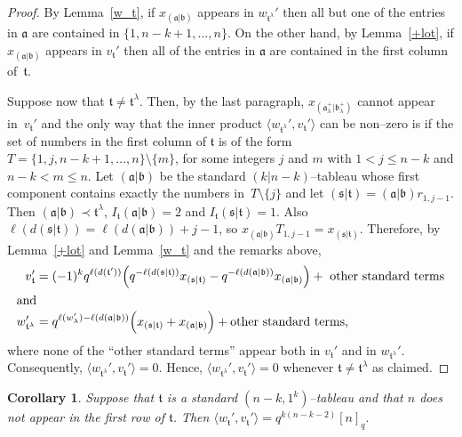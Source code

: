 \documentclass[twoside]{amsart}
\numberwithin{equation}{section}
\newtheorem{Corollary}[equation]{Corollary}
\theoremstyle{remark}
\let\>\rangle
\let\<\langle
\def\len(#1){\ell(#1)}
\def\a{\mathfrak a}
\def\b{\mathfrak b}
\def\s{\mathfrak s}
\def\t{\mathfrak t}
\begin{document}
\begin{proof}
By Lemma~\ref{w_t}, if $x_{(\a|\b)}$ appears in $w_{\t^\lambda}'$ then
all but one of the entries in $\a$ are contained in
$\{1,n-k+1,\dots,n\}$.  On the other hand, by Lemma~\ref{+lot}, if
$x_{(\a|\b)}$ appears in $v_\t'$ then all of the entries in $\a$ are
contained in the first column of~$\t$. 

Suppose now that $\t\ne\t^\lambda$. Then, by the last paragraph,
$x_{(\a_\lambda^+|\b_\lambda^+)}$ cannot appear in~$v_\t'$ and the
only way that the inner product $\<w_{\t^\lambda}',v_\t'\>$ can be
non--zero is if the set of numbers in the first column of $\t$ is of
the form $T=\{1,j,n-k+1,\dots,n\}\setminus\{m\}$, for some integers
$j$ and $m$ with $1<j\le n-k$ and $n-k<m\le n$. Let $(\a|\b)$ be the
standard $(k|n-k)$--tableau whose first component contains exactly the
numbers in~$T\setminus\{j\}$ and let $(\s|\t)=(\a|\b)r_{1,j-1}$. Then
$(\a|\b)\prec\t^\lambda$, $I_\t(\a|\b)=2$ and $I_\t(\s|\t)=1$. Also
$\len(d(\s|\t))=\len(d(\a|\b))+j-1$, so
$x_{(\a|\b)}T_{1,j-1}=x_{(\s|\t)}$. Therefore, by Lemma~\ref{+lot} and
Lemma~\ref{w_t} and the remarks above,
\begin{align*}
v_\t'&=(-1)^kq^{\len(d(\t'))}
    \Big(q^{-\len(d(\s|\t))}x_{(\s|\t)}-q^{-\len(d(\a|\b))}x_{(\a|\b)}\Big)
           +\text{\ other standard terms}\\
\intertext{and}
w_{\t^\lambda}'&=q^{\len(w_{\lambda'})-\len(d(\a|\b))}
                     \Big(x_{(\s|\t)}+x_{(\a|\b)}\Big)
+\text{other standard terms,}
\end{align*}
where none of the ``other standard terms'' appear both in $v_\t'$ and
in $w_{\t^\lambda}'$. Consequently, $\<w_{\t^\lambda}',v_\t'\>=0$.
Hence, $\<w_{\t^\lambda}',v_\t'\>=0$ whenever $\t\ne\t^\lambda$ as
claimed.
\end{proof}

\begin{Corollary}\label{n-diagonals}
Suppose that $\t$ is a standard $(n-k,1^k)$--tableau and that
$n$ does not appear in the first row of $\t$. Then
$\<w_\t',v_\t'\>=q^{k(n-k-2)}[n]_q.$
\end{Corollary}
\end{document}
